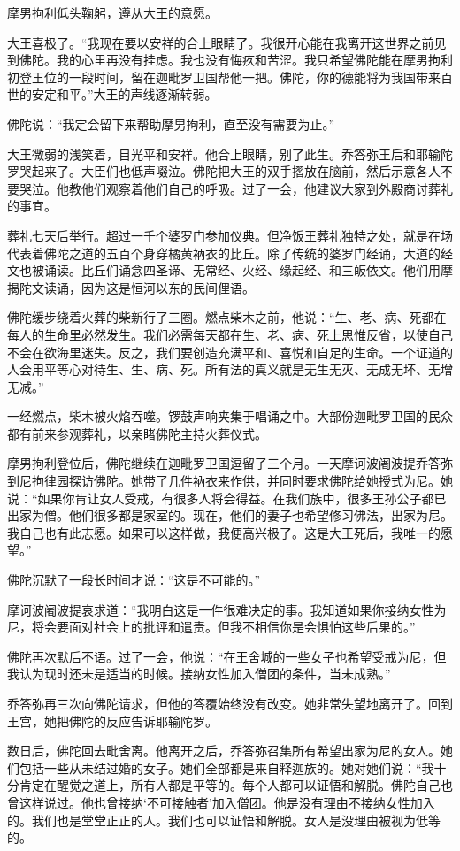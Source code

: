 \documentclass[12pt,twoside,openany]{book}
\begin{document}
摩男拘利低头鞠躬，遵从大王的意愿。

大王喜极了。“我现在要以安祥的合上眼睛了。我很开心能在我离开这世界之前见到佛陀。我的心里再没有挂虑。我也没有悔疚和苦涩。我只希望佛陀能在摩男拘利初登王位的一段时间，留在迦毗罗卫国帮他一把。佛陀，你的德能将为我国带来百世的安定和平。”大王的声线逐渐转弱。

佛陀说：“我定会留下来帮助摩男拘利，直至没有需要为止。”

大王微弱的浅笑着，目光平和安祥。他合上眼睛，别了此生。乔答弥王后和耶输陀罗哭起来了。大臣们也低声啜泣。佛陀把大王的双手摺放在脑前，然后示意各人不要哭泣。他教他们观察着他们自己的呼吸。过了一会，他建议大家到外殿商讨葬礼的事宜。

葬礼七天后举行。超过一千个婆罗门参加仪典。但净饭王葬礼独特之处，就是在场代表着佛陀之道的五百个身穿橘黄衲衣的比丘。除了传统的婆罗门经诵，大道的经文也被诵读。比丘们诵念四圣谛、无常经、火经、缘起经、和三皈依文。他们用摩揭陀文读诵，因为这是恒河以东的民间俚语。

佛陀缓步绕着火葬的柴新行了三圈。燃点柴木之前，他说：“生、老、病、死都在每人的生命里必然发生。我们必需每天都在生、老、病、死上思惟反省，以使自己不会在欲海里迷失。反之，我们要创造充满平和、喜悦和自足的生命。一个证道的人会用平等心对待生、生、病、死。所有法的真义就是无生无灭、无成无坏、无增无减。”

一经燃点，柴木被火焰吞噬。锣鼓声响夹集于唱诵之中。大部份迦毗罗卫国的民众都有前来参观葬礼，以亲睹佛陀主持火葬仪式。

摩男拘利登位后，佛陀继续在迦毗罗卫国逗留了三个月。一天摩诃波阇波提乔答弥到尼拘律园探访佛陀。她带了几件衲衣来作供，并同时要求佛陀给她授式为尼。她说：“如果你肯让女人受戒，有很多人将会得益。在我们族中，很多王孙公子都已出家为僧。他们很多都是家室的。现在，他们的妻子也希望修习佛法，出家为尼。我自己也有此志愿。如果可以这样做，我便高兴极了。这是大王死后，我唯一的愿望。”

佛陀沉默了一段长时间才说：“这是不可能的。”

摩诃波阇波提哀求道：“我明白这是一件很难决定的事。我知道如果你接纳女性为尼，将会要面对社会上的批评和遣责。但我不相信你是会惧怕这些后果的。”

佛陀再次默后不语。过了一会，他说：“在王舍城的一些女子也希望受戒为尼，但我认为现时还未是适当的时候。接纳女性加入僧团的条件，当未成熟。”

乔答弥再三次向佛陀请求，但他的答覆始终没有改变。她非常失望地离开了。回到王宫，她把佛陀的反应告诉耶输陀罗。

数日后，佛陀回去毗舍离。他离开之后，乔答弥召集所有希望出家为尼的女人。她们包括一些从未结过婚的女子。她们全部都是来自释迦族的。她对她们说：“我十分肯定在醒觉之道上，所有人都是平等的。每个人都可以证悟和解脱。佛陀自己也曾这样说过。他也曾接纳‘不可接触者’加入僧团。他是没有理由不接纳女性加入的。我们也是堂堂正正的人。我们也可以证悟和解脱。女人是没理由被视为低等的。
\end{document}
